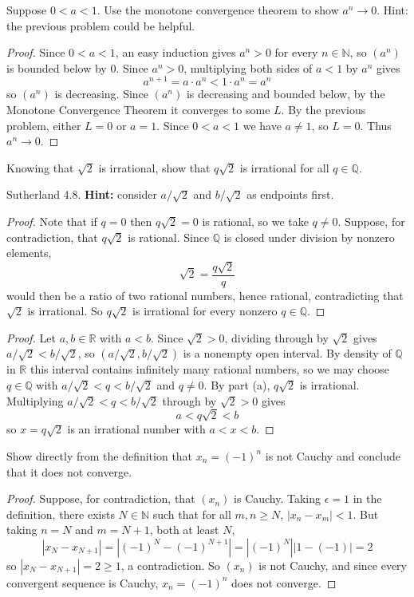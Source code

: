 \documentclass[minion]{homework}
\newcommand{\Reals}{\ensuremath{\mathbb R}}%
\newcommand{\Rats}{\ensuremath{\mathbb Q}} %
\newcommand{\Nats}{\ensuremath{\mathbb N}} %
\begin{document}
\begin{problems}
\problem Suppose $0<a<1$.  Use the monotone convergence theorem
to show $a^n\to 0$. Hint: the previous
problem could be helpful.
\newline
\begin{proof}
  Since $0 < a < 1$, an easy induction gives $a^n > 0$ for every $n \in \Nats$, so $(a^n)$ is bounded below by $0$. Since $a^n > 0$, multiplying both sides of $a < 1$ by $a^n$ gives
  $$a^{n+1} = a \cdot a^n < 1 \cdot a^n = a^n$$
  so $(a^n)$ is decreasing. Since $(a^n)$ is decreasing and bounded below, by the Monotone Convergence Theorem it converges to some $L$. By the previous problem, either $L = 0$ or $a = 1$. Since $0 < a < 1$ we have $a \neq 1$, so $L = 0$. Thus $a^n \to 0$.
\end{proof}

\problem
\begin{subproblems}
\item Knowing that $\sqrt{2}$ is irrational, show that $q\sqrt{2}$
is irrational for all $q\in \Rats$.
\item  Sutherland 4.8. \textbf{Hint:} consider $a/\sqrt{2}$ and $b/\sqrt{2}$ as endpoints first.
\end{subproblems}
\subsol
\begin{proof}
  Note that if $q=0$ then $q\sqrt2 = 0$ is rational, so we take $q \neq 0$. Suppose, for contradiction, that $q\sqrt2$ is rational. Since $\Rats$ is closed under division by nonzero elements,
  $$\sqrt2 = \frac{q\sqrt2}{q}$$
  would then be a ratio of two rational numbers, hence rational, contradicting that $\sqrt2$ is irrational. So $q\sqrt2$ is irrational for every nonzero $q \in \Rats$.
\end{proof}

\subsol
\begin{proof}
  Let $a,b \in \Reals$ with $a<b$. Since $\sqrt2 > 0$, dividing through by $\sqrt2$ gives $a/\sqrt2 < b/\sqrt2$, so $(a/\sqrt2, b/\sqrt2)$ is a nonempty open interval. By density of $\Rats$ in $\Reals$ this interval contains infinitely many rational numbers, so we may choose $q \in \Rats$ with $a/\sqrt2 < q < b/\sqrt2$ and $q \neq 0$. By part (a), $q\sqrt2$ is irrational. Multiplying $a/\sqrt2 < q < b/\sqrt2$ through by $\sqrt2 > 0$ gives
  $$a < q\sqrt2 < b$$
  so $x = q\sqrt2$ is an irrational number with $a < x < b$.
\end{proof}

\problem Show directly from the definition that $x_n = (-1)^n$ is not
Cauchy and conclude that it does not converge.
\newline
\begin{proof}
  Suppose, for contradiction, that $(x_n)$ is Cauchy. Taking $\epsilon = 1$ in the definition, there exists $N \in \Nats$ such that for all $m,n \geq N$, $|x_n - x_m| < 1$. But taking $n = N$ and $m = N+1$, both at least $N$,
  $$|x_N - x_{N+1}| = |(-1)^N - (-1)^{N+1}| = |(-1)^N||1-(-1)| = 2$$
  so $|x_N - x_{N+1}| = 2 \geq 1$, a contradiction. So $(x_n)$ is not Cauchy, and since every convergent sequence is Cauchy, $x_n = (-1)^n$ does not converge.
\end{proof}


\end{problems}
\end{document}
